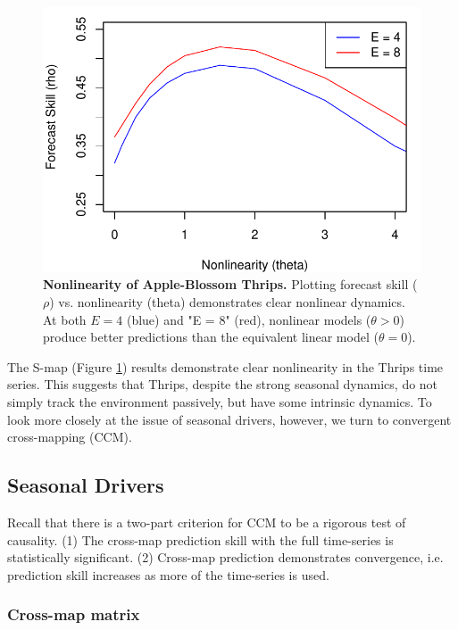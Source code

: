 \begin{figure}[!ht]
\begin{center}\includegraphics[width=\maxwidth{\textwidth}]{fig_redm_15.pdf}\end{center}
\caption[Nonlinearity of Apple-Blossom Thrips.]{\textbf{Nonlinearity of Apple-Blossom Thrips.}\newline
Plotting forecast skill ($\rho$) vs. nonlinearity (theta) demonstrates clear nonlinear dynamics. At both $E = 4$ (blue) and "E = 8" (red), nonlinear models ($\theta > 0$) produce better predictions than the equivalent linear model ($\theta = 0$).}
\label{fig_redm_thrips_smap}
\end{figure}

The S-map (Figure \ref{fig_redm_thrips_smap}) results demonstrate clear nonlinearity in the Thrips time series. This suggests that Thrips, despite the strong seasonal dynamics, do not simply track the environment passively, but have some intrinsic dynamics. To look more closely at the issue of seasonal drivers, however, we turn to convergent cross-mapping (CCM).

\subsection{Seasonal Drivers}

Recall that there is a two-part criterion for CCM to be a rigorous test of causality. (1) The cross-map prediction skill with the full time-series is statistically significant. (2) Cross-map prediction demonstrates convergence, i.e. prediction skill increases as more of the time-series is used. 

\subsubsection{Cross-map matrix}

